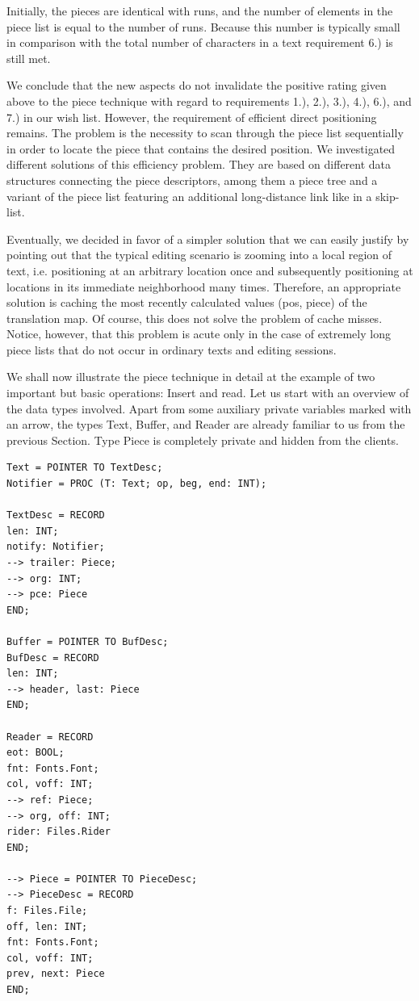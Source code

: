 Initially, the pieces are identical with runs, and the number of elements in the piece list is equal to
the number of runs. Because this number is typically small in comparison with the total number of
characters in a text requirement 6.) is still met.

We conclude that the new aspects do not invalidate the positive rating given above to the piece
technique with regard to requirements 1.), 2.), 3.), 4.), 6.), and 7.) in our wish list. However, the
requirement of efficient direct positioning remains. The problem is the necessity to scan through the
piece list sequentially in order to locate the piece that contains the desired position. We investigated
different solutions of this efficiency problem. They are based on different data structures connecting
the piece descriptors, among them a piece tree and a variant of the piece list featuring an additional
long-distance link like in a skip-list.

Eventually, we decided in favor of a simpler solution that we can easily justify by pointing out that
the typical editing scenario is zooming into a local region of text, i.e. positioning at an arbitrary
location once and subsequently positioning at locations in its immediate neighborhood many times.
Therefore, an appropriate solution is caching the most recently calculated values (pos, piece) of the
translation map. Of course, this does not solve the problem of cache misses. Notice, however, that
this problem is acute only in the case of extremely long piece lists that do not occur in ordinary texts
and editing sessions.

We shall now illustrate the piece technique in detail at the example of two important but basic
operations: Insert and read. Let us start with an overview of the data types involved. Apart from
some auxiliary private variables marked with an arrow, the types Text, Buffer, and Reader are
already familiar to us from the previous Section. Type Piece is completely private and hidden from
the clients.
\begin{verbatim}
Text = POINTER TO TextDesc;
Notifier = PROC (T: Text; op, beg, end: INT);

TextDesc = RECORD
len: INT;
notify: Notifier;
--> trailer: Piece;
--> org: INT;
--> pce: Piece
END;

Buffer = POINTER TO BufDesc;
BufDesc = RECORD
len: INT;
--> header, last: Piece
END;

Reader = RECORD
eot: BOOL;
fnt: Fonts.Font;
col, voff: INT;
--> ref: Piece;
--> org, off: INT;
rider: Files.Rider
END;

--> Piece = POINTER TO PieceDesc;
--> PieceDesc = RECORD
f: Files.File;
off, len: INT;
fnt: Fonts.Font;
col, voff: INT;
prev, next: Piece
END;
\end{verbatim}

